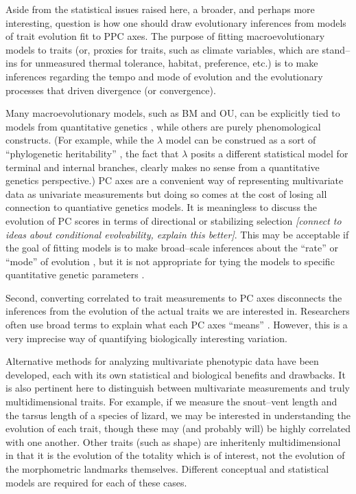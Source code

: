 \documentclass[a4paper,12pt]{article}
\begin{document}
Aside from the statistical issues raised here, a broader, and perhaps more interesting, question is how one should draw evolutionary inferences from models of trait evolution fit to PPC axes. The purpose of fitting macroevolutionary models to traits (or, proxies for traits, such as climate variables, which are stand--ins for unmeasured thermal tolerance, habitat, preference, etc.) is to make inferences regarding the tempo and mode of evolution and the evolutionary processes that driven divergence (or convergence). 

Many macroevolutionary models, such as BM and OU, can be explicitly tied to models from quantitative genetics \citep{HansenMartins1996, PennellHarmon, PennellPE}, while others \citep[notably the tree transformations $\lambda, \delta, \kappa$ proposed by][]{Pagel1997, Pagel1999} are purely phenomological constructs. (For example, while the $\lambda$ model \citep{Pagel1999} can be construed as a sort of ``phylogenetic heritability'' \citep{HansenOrzack2005}, the fact that $\lambda$ posits a different statistical model for terminal and internal branches, clearly makes no sense from a quantitative genetics perspective.)  PC axes are a convenient way of representing multivariate data as univariate measurements but doing so comes at the cost of losing all connection to quantiative genetics models. It is meaningless to discuss the evolution of PC scores in terms of directional or stabilizing selection \emph{[connect to ideas about conditional evolvability, explain this better]}.  This may be acceptable if the goal of fitting models is to make broad--scale inferences about the ``rate'' or ``mode'' of evolution \citep{Hunt2012}, but it is not appropriate for tying the models to specific quantitative genetic parameters \citep[\emph{sensu}][]{EstesArnold2007, PennellPE}.

Second, converting correlated to trait measurements to PC axes disconnects the inferences from the evolution of the actual traits we are interested in. Researchers often use broad terms to explain what each PC axes ``means'' \citep[such as claiming PC1 represents ``size'' and PC1 represents ``shape''][]{Harmon2010, Price2014}. However, this is a very imprecise way of quantifying biologically interesting variation.

Alternative methods for analyzing multivariate phenotypic data have been developed, each with its own statistical and biological benefits and drawbacks. It is also pertinent here to distinguish between multivariate measurements and truly multidimensional traits. For example, if we measure the snout--vent length and the tarsus length of a species of lizard, we may be interested in understanding the evolution of each trait, though these may (and probably will) be highly correlated with one another. Other traits (such as shape) are inheritenly multidimensional in that it is the evolution of the totality which is of interest, not the evolution of the morphometric landmarks themselves. Different conceptual and statistical models are required for each of these cases.
\end{document}
